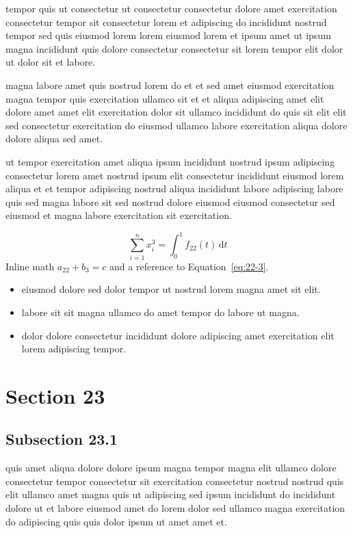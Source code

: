 \documentclass{article}
\begin{document}
tempor quis ut consectetur ut consectetur consectetur dolore amet exercitation consectetur tempor sit consectetur lorem et adipiscing do incididunt nostrud tempor sed quis eiusmod lorem lorem eiusmod lorem et ipsum amet ut ipsum magna incididunt quis dolore consectetur consectetur sit lorem tempor elit dolor ut dolor sit et labore.

magna labore amet quis nostrud lorem do et et sed amet eiusmod exercitation magna tempor quis exercitation ullamco sit et et aliqua adipiscing amet elit dolore amet amet elit exercitation dolor sit ullamco incididunt do quis sit elit elit sed consectetur exercitation do eiusmod ullamco labore exercitation aliqua dolore dolore aliqua sed amet.

ut tempor exercitation amet aliqua ipsum incididunt nostrud ipsum adipiscing consectetur lorem amet nostrud ipsum elit consectetur incididunt eiusmod lorem aliqua et et tempor adipiscing nostrud aliqua incididunt labore adipiscing labore quis sed magna labore sit sed nostrud dolore eiusmod eiusmod consectetur sed eiusmod et magna labore exercitation sit exercitation.

\begin{equation}\label{eq:22-3}
  \sum_{i=1}^{n} x_i^{3} = \int_0^1 f_{22}(t)\,\mathrm{d}t
\end{equation}
Inline math $a_{22} + b_{3} = c$ and a reference to Equation~\eqref{eq:22-3}.

\begin{itemize}
  \item eiusmod dolore sed dolor tempor ut nostrud lorem magna amet sit elit.
  \item labore sit sit magna ullamco do amet tempor do labore ut magna.
  \item dolor dolore consectetur incididunt dolore adipiscing amet exercitation elit lorem adipiscing tempor.
\end{itemize}

\section{Section 23}\label{sec:23}
\subsection{Subsection 23.1}\label{sec:23-1}
quis amet aliqua dolore dolore ipsum magna tempor magna elit ullamco dolore consectetur tempor consectetur sit exercitation consectetur nostrud nostrud quis elit ullamco amet magna quis ut adipiscing sed ipsum incididunt do incididunt dolore ut et labore eiusmod amet do lorem dolor sed ullamco magna exercitation do adipiscing quis quis dolor ipsum ut amet amet et.
\end{document}
